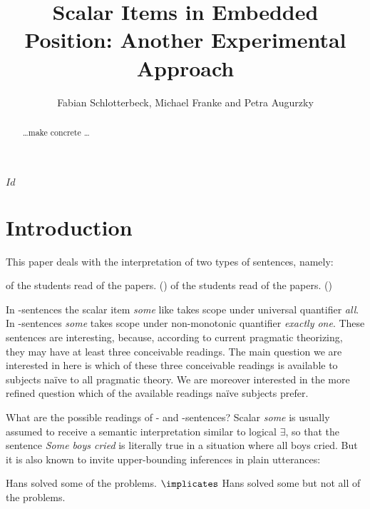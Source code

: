 \documentclass[fleqn,reqno,10pt,draft]{article}
\title{Scalar Items in Embedded Position: {A}nother Experimental Approach}
\author{Fabian Schlotterbeck, Michael Franke and Petra Augurzky}
\date{}
\newcommand{\as}{\acro{as}}
\renewcommand{\es}{\acro{es}}
\renewcommand{\AE}{\as}
\newcommand{\GE}{\es}
\newcommand{\mymark}[1]{{\color{mycol}{#1}}}
\begin{document}
\maketitle


\begin{abstract}
  \dots make concrete \dots
\end{abstract}

\svnInfo $Id$

\section{Introduction}
\label{sec:introduction}

This paper deals with the interpretation of two types of
sentences, namely:

\begin{exe}
\ex \label{bsp:AE}
  \mymark{All} of the students read \mymark{some} of the
  papers. \hfill (\AE)
\ex \label{bsp:GE} 
  \mymark{Exactly one} of the students read \mymark{some} of the
  papers. \hfill (\GE)
\end{exe}

\noindent In \as-sentences the scalar item \emph{some} like takes
scope under universal quantifier \emph{all}. In \es-sentences
\emph{some} takes scope under non-monotonic quantifier \emph{exactly
  one}. These sentences are interesting, because, according to current
pragmatic theorizing, they may have at least three conceivable
readings. The main question we are interested in here is which of
these three conceivable readings is available to subjects na\"{i}ve to
all pragmatic theory. We are moreover interested in the more refined
question which of the available readings na\"{i}ve subjects prefer.

What are the possible readings of \as- and \es-sentences? Scalar
\emph{some} is usually assumed to receive a semantic interpretation
similar to logical $\exists$, so that the sentence \emph{Some boys
  cried} is literally true in a situation where all boys cried. But it
is also known to invite upper-bounding inferences in plain utterances:

\begin{exe}
  \ex \label{bsp:Plain-SI}
    \begin{xlist}
      \ex \label{bsp:Plain-SI-Target} Hans solved some of the problems.
      \ex \label{bsp:Plain-SI-Implicature} $\implicates$ Hans solved some but not all of the problems.
    \end{xlist}
\end{exe}
\end{document}
